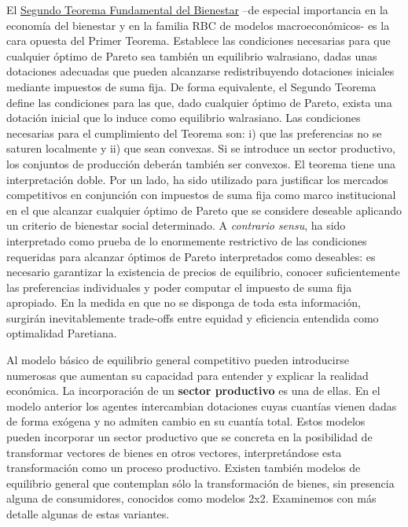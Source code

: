 \documentclass{nuevotema}
\begin{document}
El \underline{Segundo Teorema Fundamental del Bienestar} --de especial importancia en la economía del bienestar y en la familia RBC de modelos macroeconómicos- es la cara opuesta del Primer Teorema. Establece las condiciones necesarias para que cualquier óptimo de Pareto sea también un equilibrio walrasiano, dadas unas dotaciones adecuadas que pueden alcanzarse redistribuyendo dotaciones iniciales mediante impuestos de suma fija. De forma equivalente, el Segundo Teorema define las condiciones para las que, dado cualquier óptimo de Pareto, exista una dotación inicial que lo induce como equilibrio walrasiano. Las condiciones necesarias para el cumplimiento del Teorema son: i) que las preferencias no se saturen localmente y ii) que sean convexas. Si se introduce un sector productivo, los conjuntos de producción deberán también ser convexos. El teorema tiene una interpretación doble. Por un lado, ha sido utilizado para justificar los mercados competitivos en conjunción con impuestos de suma fija como marco institucional en el que alcanzar cualquier óptimo de Pareto que se considere deseable aplicando un criterio de bienestar social determinado. A \textit{contrario sensu}, ha sido interpretado como prueba de lo enormemente restrictivo de las condiciones requeridas para alcanzar óptimos de Pareto interpretados como deseables: es necesario garantizar la existencia de precios de equilibrio, conocer suficientemente las preferencias individuales y poder computar el impuesto de suma fija apropiado. En la medida en que no se disponga de toda esta información, surgirán inevitablemente trade-offs entre equidad y eficiencia entendida como optimalidad Paretiana.
 
Al modelo básico de equilibrio general competitivo pueden introducirse numerosas  que aumentan su capacidad para entender y explicar la realidad económica. La incorporación de un \textbf{sector productivo} es una de ellas. En el modelo anterior los agentes intercambian dotaciones cuyas cuantías vienen dadas de forma exógena y no admiten cambio en su cuantía total. Estos modelos pueden incorporar un sector productivo que se concreta en la posibilidad de transformar vectores de bienes en otros vectores, interpretándose esta transformación como un proceso productivo. Existen también modelos de equilibrio general que contemplan sólo la transformación de bienes, sin presencia alguna de consumidores, conocidos como modelos 2x2. Examinemos con más detalle algunas de estas variantes.
\end{document}
